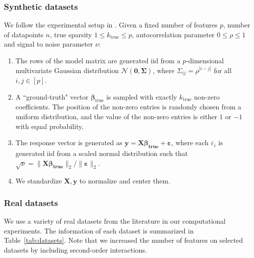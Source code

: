 \documentclass[opre,nonblindrev]{informs3} %
\begin{document}
\subsubsection{Synthetic datasets}\label{sec:synt_generation} We follow the experimental setup in \cite{bertsimas2020sparse2}. Given a fixed number of features $p$, number of datapoints $n$, true sparsity $1\leq k_{\text{true}}\leq p$, autocorrelation parameter $0\leq \rho\leq 1$ and signal to noise parameter $\nu$:
\begin{enumerate}
\item The rows of the model matrix are generated iid from a $p$-dimensional multivariate Gaussian distribution $\mathcal{N}(\bm{0},\bm{\Sigma})$, where $\Sigma_{ij}=\rho^{|i-j|}$ for all $i,j\in [p]$.
\item A ``ground-truth" vector $\bm{\beta}_{\text{true}}$ is sampled with exactly $k_{\text{true}}$ non-zero coefficients. The position of the non-zero entries is randomly chosen from a uniform distribution, and the value of the non-zero entries is either $1$ or $-1$ with equal probability.
\item The response vector is generated as $\bm{y}=\bm{X\beta_{\text{true}}}+\bm{\varepsilon}$, where each $\varepsilon_i$ is generated iid from a scaled normal distribution such that $\sqrt{\nu}=\|\bm{X\beta_{\text{true}}}\|_2/\|\bm{\varepsilon}\|_2$. 
\item We standardize $\bm{X}, \bm{y}$ to normalize and center them.
\end{enumerate}

\subsubsection{Real datasets}

We use a variety of real datasets from the literature in our computational experiments. The information of each dataset is summarized in Table~\ref{tab:datasets}. Note that we increased the number of features on selected datasets by including second-order interactions.%
\end{document}
